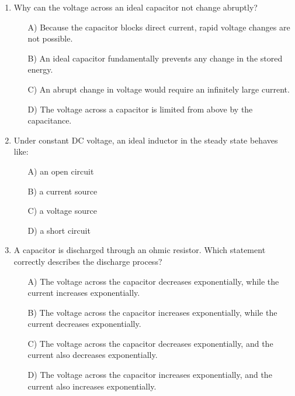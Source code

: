 \documentclass[a4paper,12pt]{article}
\newif\ifshowsolutions
\begin{document}
\begin{enumerate}[label=\textbf{\arabic*.}, leftmargin=*, itemsep=8pt]
\ifshowsolutions
Solution: A
\fi

  \item Why can the voltage across an ideal capacitor not change abruptly?
    \begin{itemize}[label=$\square$]
      \item[A)] Because the capacitor blocks direct current, rapid voltage changes are not possible.
      \item[B)] An ideal capacitor fundamentally prevents any change in the stored energy.
      \item[C)] An abrupt change in voltage would require an infinitely large current.
      \item[D)] The voltage across a capacitor is limited from above by the capacitance.
    \end{itemize}

\ifshowsolutions
Solution: C
\fi

  \item Under constant DC voltage, an ideal inductor in the steady state behaves like:
    \begin{itemize}[label=$\square$]
      \item[A)] an open circuit
      \item[B)] a current source
      \item[C)] a voltage source
      \item[D)] a short circuit
    \end{itemize}

\ifshowsolutions
Solution: D
\fi

  \item A capacitor is discharged through an ohmic resistor. Which statement correctly describes the discharge process?
    \begin{itemize}[label=$\square$]
      \item[A)] The voltage across the capacitor decreases exponentially, while the current increases exponentially.
      \item[B)] The voltage across the capacitor increases exponentially, while the current decreases exponentially.
      \item[C)] The voltage across the capacitor decreases exponentially, and the current also decreases exponentially.
      \item[D)] The voltage across the capacitor increases exponentially, and the current also increases exponentially.
    \end{itemize}


\end{enumerate}
\end{document}
